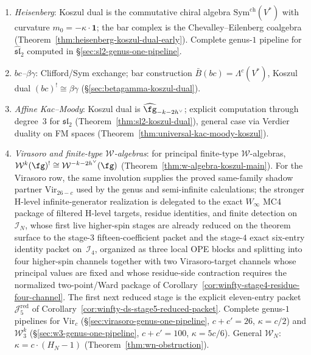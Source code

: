 \begin{enumerate}[label=(\roman*)]
\item \emph{Heisenberg}: Koszul dual is the commutative chiral algebra
$\mathrm{Sym}^{\mathrm{ch}}(V^*)$ with curvature $m_0 = -\kappa \cdot \mathbf{1}$;
the bar complex is the Chevalley--Eilenberg coalgebra
(Theorem~\ref{thm:heisenberg-koszul-dual-early}).
Complete genus-$1$ pipeline for $\widehat{\mathfrak{sl}}_2$ computed
in \S\ref{sec:sl2-genus-one-pipeline}.
\item \emph{$bc$--$\beta\gamma$}: Clifford/Sym exchange;
bar construction $\bar{B}(bc) = \Lambda^c(V^*)$, Koszul dual
$(bc)^! \cong \beta\gamma$
(\S\ref{sec:betagamma-koszul-dual}).
\item \emph{Affine Kac--Moody}: Koszul dual is
$\widehat{\fg}_{-k-2h^\vee}$; explicit computation through degree~$3$
for $\mathfrak{sl}_2$ (Theorem~\ref{thm:sl2-koszul-dual}),
general case via Verdier duality on FM spaces
(Theorem~\ref{thm:universal-kac-moody-koszul}).
\item \emph{Virasoro and finite-type $\mathcal{W}$-algebras}:
for principal finite-type $\mathcal{W}$-algebras,
$\mathcal{W}^k(\fg)^! \cong \mathcal{W}^{-k-2h^\vee}(\fg)$
(Theorem~\ref{thm:w-algebra-koszul-main}).
For the Virasoro row, the same involution supplies the proved
same-family shadow partner $\mathrm{Vir}_{26-c}$ used by the
genus and semi-infinite calculations; the stronger H-level
infinite-generator realization is delegated to the exact
$W_\infty$ MC4 package of filtered H-level targets, residue identities,
and finite detection on $\mathcal{I}_N$, whose first live
higher-spin stages are already reduced on the theorem surface to the
stage-$3$ fifteen-coefficient packet and the stage-$4$
exact six-entry identity packet on~$\mathcal{I}_4$, organized as three
local OPE blocks and splitting into four higher-spin channels together
with two Virasoro-target channels whose principal values are fixed and
whose residue-side contraction requires the normalized two-point/Ward
package of Corollary~\ref{cor:winfty-stage4-residue-four-channel}.  The
first next reduced stage is the explicit eleven-entry packet
$\mathcal{J}_5^{\mathrm{red}}$ of
Corollary~\ref{cor:winfty-ds-stage5-reduced-packet}.
Complete genus-$1$ pipelines for $\mathrm{Vir}_c$
(\S\ref{sec:virasoro-genus-one-pipeline}, $c + c' = 26$, $\kappa = c/2$)
and $\mathcal{W}_3^k$
(\S\ref{sec:w3-genus-one-pipeline}, $c + c' = 100$, $\kappa = 5c/6$).
General $\mathcal{W}_N$: $\kappa = c \cdot (H_N - 1)$
(Theorem~\ref{thm:wn-obstruction}).
\end{enumerate}

